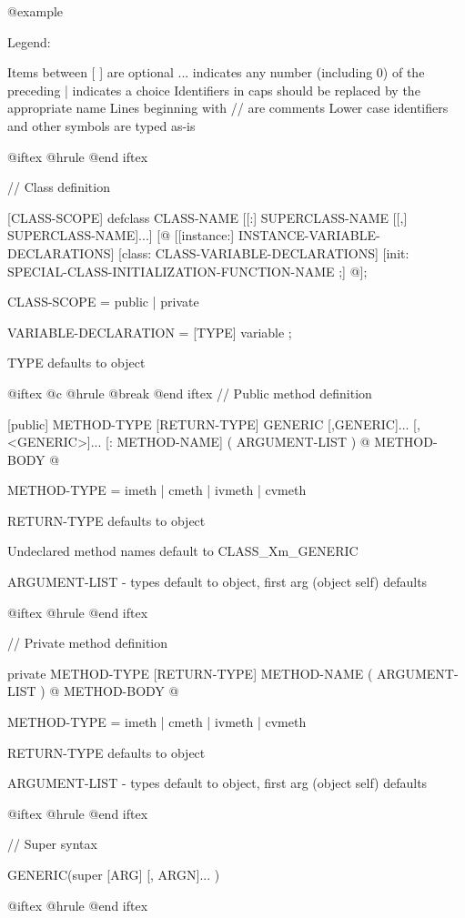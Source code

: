 @example

Legend:

        Items between [ ] are optional
        ... indicates any number (including 0) of the preceding
        | indicates a choice
        Identifiers in caps should be replaced by the appropriate name
        Lines beginning with // are comments
        Lower case identifiers and other symbols are typed as-is

@iftex
@hrule
@end iftex

// Class definition

[CLASS-SCOPE]  defclass  CLASS-NAME
        [[:]  SUPERCLASS-NAME  [[,] SUPERCLASS-NAME]...]
[@{
        [[instance:]
                INSTANCE-VARIABLE-DECLARATIONS]
        [class:
                CLASS-VARIABLE-DECLARATIONS]
        [init:
                SPECIAL-CLASS-INITIALIZATION-FUNCTION-NAME ;]
@}];


CLASS-SCOPE = public | private

VARIABLE-DECLARATION = [TYPE]  variable ;

TYPE defaults to object

@iftex
@c @hrule
@break
@end iftex
//  Public method definition 

[public]  METHOD-TYPE [RETURN-TYPE]  GENERIC [,GENERIC]...
        [,<GENERIC>]... [: METHOD-NAME]  ( ARGUMENT-LIST )
@{
        METHOD-BODY
@}

METHOD-TYPE = imeth | cmeth | ivmeth | cvmeth

RETURN-TYPE defaults to object

Undeclared method names default to CLASS_Xm_GENERIC

ARGUMENT-LIST - types default to object,
                first arg (object self) defaults

@iftex
@hrule
@end iftex

//  Private method definition 

private METHOD-TYPE [RETURN-TYPE]  METHOD-NAME
        ( ARGUMENT-LIST )
@{
        METHOD-BODY
@}

METHOD-TYPE = imeth | cmeth | ivmeth | cvmeth

RETURN-TYPE defaults to object

ARGUMENT-LIST - types default to object,
                first arg (object self) defaults

@iftex
@hrule
@end iftex

//  Super syntax

GENERIC(super [ARG]  [, ARGN]... )

@iftex
@hrule
@end iftex

